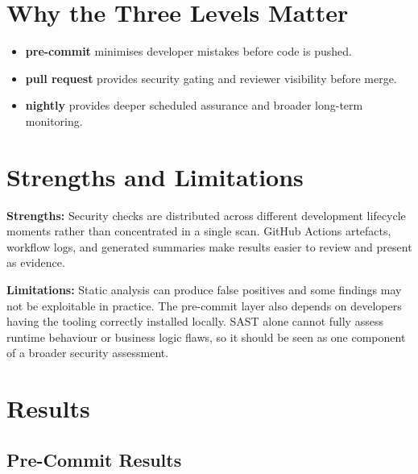 \documentclass[12pt,a4paper]{report}
\begin{document}
\section{Why the Three Levels Matter}

\begin{itemize}
  \item \textbf{pre-commit} minimises developer mistakes before code is pushed.
  \item \textbf{pull request} provides security gating and reviewer visibility before merge.
  \item \textbf{nightly} provides deeper scheduled assurance and broader long-term monitoring.
\end{itemize}

\section{Strengths and Limitations}

\textbf{Strengths:} Security checks are distributed across different development lifecycle moments rather than concentrated in a single scan. GitHub Actions artefacts, workflow logs, and generated summaries make results easier to review and present as evidence.

\textbf{Limitations:} Static analysis can produce false positives and some findings may not be exploitable in practice. The pre-commit layer also depends on developers having the tooling correctly installed locally. SAST alone cannot fully assess runtime behaviour or business logic flaws, so it should be seen as one component of a broader security assessment.

\section{Results}

\subsection{Pre-Commit Results}
\end{document}
